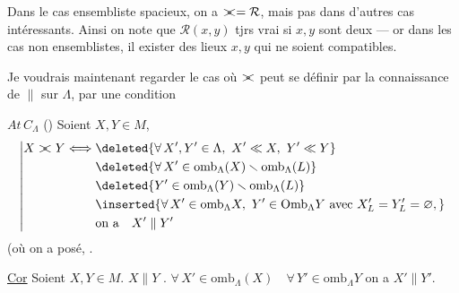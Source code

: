 Dans le cas  ensembliste spacieux, on a $\mathrel{\rlap{$>$}<}=\mathcal R$, mais pas dans d'autres cas intéressants. Ainsi on note que $\mathcal R(x,y)$ tjrs vrai si $x,y$ sont deux  --- or dans les cas non ensemblistes, il  exister des lieux $x,y$ qui ne soient compatibles.

Je voudrais maintenant regarder le cas où $\mathrel{\rlap{$>$}<}$ peut se définir par la connaissance de $\parallel$ sur $\Lambda$, par une condition

\uline{$At\,C$}$_{\Lambda}$ () Soient $X,Y\in M$, 
\[
\left|\begin{aligned}
X\mathrel{\rlap{$>$}<} Y\Longleftrightarrow{}&\deleted{\forall\,X',Y'\in\Lambda,\ X'\ll X,\ Y'\ll Y}\\
&\deleted{\forall\,X'\in \mathrm{omb}_{\Lambda}(X)\smallsetminus \mathrm{omb}_{\Lambda}(L)}\\
&\deleted{Y'\in \mathrm{omb}_{\Lambda}(Y)\smallsetminus \mathrm{omb}_{\Lambda}(L)}\\
&\inserted{\forall\,X'\in \mathrm{omb}_{\Lambda}X,\ Y'\in\mathrm{Omb}_{\Lambda}Y\ \text{avec }X'_L=Y'_L=\varnothing,}\\
&\text{on a}\quad X'\parallel Y'
\end{aligned}\right.
\]
(où on a posé,  \unsure{\}}.

\uline{Cor} Soient $X,Y\in M$.    $X\parallel Y$ .  $\forall\, X'\in \mathrm{omb}_{\Lambda}(X)\quad\forall\,Y'\in \mathrm{omb}_{\Lambda}Y$ on a $X'\parallel Y'$.

